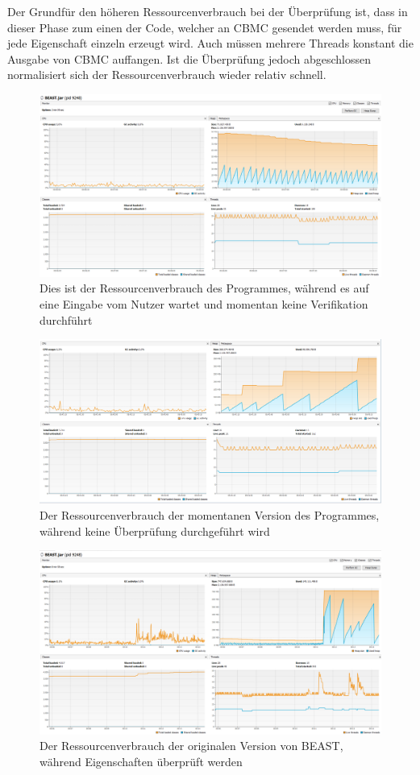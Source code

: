 \documentclass[a4paper]{scrreprt}
\begin{document}
Der Grundfür den höheren Ressourcenverbrauch bei der Überprüfung ist, dass in dieser Phase zum einen der Code, welcher an CBMC gesendet
werden muss, für jede Eigenschaft einzeln erzeugt wird. Auch müssen mehrere Threads
konstant die Ausgabe von CBMC auffangen.
Ist die Überprüfung jedoch abgeschlossen normalisiert sich der
Ressourcenverbrauch wieder relativ schnell.

\newpage
\begin{figure}[ht]
	\centering
  \includegraphics[width=1.0\textwidth,
  height=0.40\textwidth]{images/OLD_NO.png} \caption{Dies ist der
  Ressourcenverbrauch des Programmes, während es auf eine Eingabe vom Nutzer wartet und momentan keine Verifikation durchführt}
	\label{fig1}
\end{figure}

\vspace{4cm}

\begin{figure}[ht]
	\centering
  \includegraphics[width=1.0\textwidth,
  height=0.40\textwidth]{images/NEW_NO.png} \caption{Der Ressourcenverbrauch der
  momentanen Version des Programmes, während keine Überprüfung durchgeführt wird}
	\label{fig2}
\end{figure}


\newpage

\begin{figure}[ht]
	\centering
  \includegraphics[width=1.0\textwidth,
  height=0.4\textwidth]{images/OLD_YES.png} \caption{Der Ressourcenverbrauch
 der originalen Version von BEAST, während Eigenschaften überprüft werden}
	\label{fig3}
\end{figure}
\end{document}
